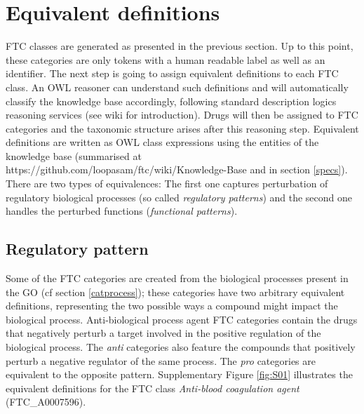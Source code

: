 \documentclass{bioinfo}
\begin{document}
\section{Equivalent definitions}
FTC classes are generated as presented in the previous section. Up to this point, these categories 
are only tokens with a human readable label as well as an identifier. The next step is going to 
assign equivalent definitions to each FTC class. An OWL reasoner can understand such definitions and will automatically 
classify the knowledge base accordingly, following standard description logics reasoning services (see wiki for introduction).
Drugs will then be assigned to FTC categories and the taxonomic structure 
arises after this reasoning step. Equivalent definitions are written as OWL class expressions using the entities of 
the knowledge base (summarised at {{https://github.com/loopasam/ftc/wiki/Knowledge-Base}} and in section \ref{specs}).
There are two types of equivalences: The first one captures perturbation of regulatory 
biological processes (so called \emph{regulatory patterns}) and the second one handles the perturbed functions (\emph{functional patterns}).

\subsection{Regulatory pattern}
Some of the FTC categories are created from the biological processes present in the 
GO (cf section \ref{catprocess}); these categories have two arbitrary equivalent definitions, representing the 
two possible ways a compound might impact the biological process. Anti-biological process agent FTC categories 
contain the drugs that negatively perturb a target involved in the positive regulation of the biological process. 
The \emph{anti} categories also feature the compounds that positively perturb a negative regulator of the same process. 
The \emph{pro} categories are equivalent to the opposite pattern. Supplementary Figure \ref{fig:S01} illustrates the equivalent definitions for the 
FTC class \emph{Anti-blood coagulation agent} (FTC\_A0007596).
 
\end{document}
